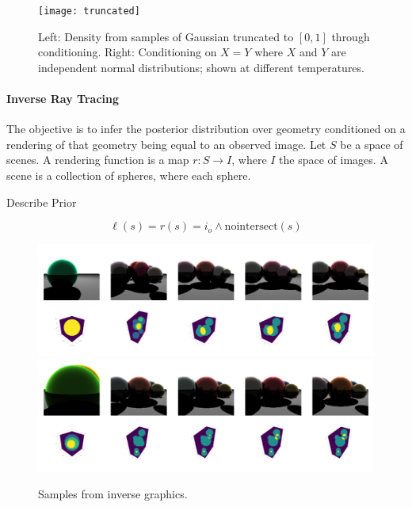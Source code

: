 \begin{figure}[!htb]
\centering
\texttt{[image: truncated]}

	
	
	\caption{Left: Density from samples of Gaussian truncated to $[0, 1]$ through conditioning. Right: Conditioning on $X = Y$ where $X$ and $Y$ are independent normal distributions; shown at different temperatures.}
	\label{fig:density}
\end{figure}



\paragraph{Inverse Ray Tracing}
The objective is to infer the posterior distribution over geometry conditioned on a rendering of that geometry being equal to an observed image.
Let $S$ be a space of scenes.
A rendering function is a map $r: S \to I$, where $I$ the space of images.
A scene is a collection of spheres, where each sphere.


Describe Prior

$$
\ell(s) = r(s) = i_o \land \textrm{nointersect}(s)
$$


\begin{figure}
	\centering
	\includegraphics[width=0.9\linewidth]{invg2.pdf}
	\includegraphics[width=0.9\linewidth]{invgb.pdf}
	\caption{ Samples from inverse graphics.}
	\label{fig:invrtmcmc}
\end{figure}


